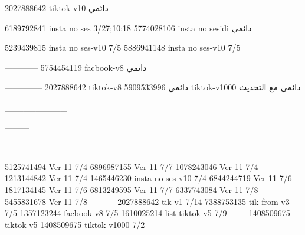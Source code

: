 2027888642 tiktok-v10
دائمي

6189792841 insta no ses
3/27;10:18
5774028106 insta no sesidi
دائمي

5239439815 insta no ses-v10
7/5
5886941148 insta no ses-v10
7/5

------------
5754454119 facbook-v8
دائمي


--------------
2027888642 tiktok-v8
دائمي
5909533996 tiktok-v1000
دائمي مع التحديث

__________

---------

------------

5125741494-Ver-11
7/4
6896987155-Ver-11
7/7
1078243046-Ver-11
7/4
1213144842-Ver-11
7/4
1465446230 insta no ses-v10
7/4
6844244719-Ver-11
7/6
1817134145-Ver-11
7/6
6813249595-Ver-11
7/7
6337743084-Ver-11
7/8
5455831678-Ver-11
7/8
---------
2027888642-tik-v1
7/14
7388753135 tik from v3
7/5
1357123244 facbook-v8
7/5
1610025214 list tiktok v5
7/9
------
1408509675 tiktok-v5
1408509675 tiktok-v1000
7/2

